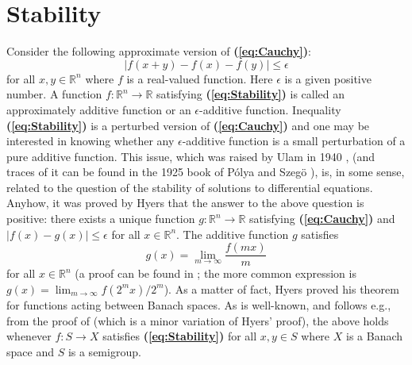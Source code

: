 \documentclass[12 pt]{amsart}
\theoremstyle{definition}
\newcommand{\R}{\mathbb{R}}
\newcommand{\beqref}[1]{\textbf{(\ref{#1})}} %
\begin{document}
\section{Stability}\label{sec:Stability} Consider the following approximate version of \beqref{eq:Cauchy}: 
\begin{equation}\label{eq:Stability}
|f(x+y)-f(x)-f(y)|\leq\epsilon 
\end{equation}
for all $x,y\in \R^n$ where $f$ is a real-valued function. Here $\epsilon$ is a given positive number. A function 
$f:\R^n\to\R$ satisfying \beqref{eq:Stability} is called an approximately additive function 
or an $\epsilon$-additive function. Inequality \beqref{eq:Stability} is a perturbed 
version of \beqref{eq:Cauchy} and one may be interested in knowing whether any 
$\epsilon$-additive function is a small perturbation of a pure additive function. 
This issue, which was raised by Ulam in 1940 \cite[p. 222]{Hyers1941}, \cite[p. 64]{Ulam1960} (and traces of it can be found in the 1925 book of P\'olya and Szeg\"o \cite[Problem 99, p. 17]{PolyaSzego1925book}), is, in some sense, related to the question 
of the stability of solutions to differential equations. Anyhow, it was proved by 
Hyers \cite{Hyers1941} 
 that the answer to the above question is positive: there exists 
 a unique function $g:\R^n\to\R$ satisfying \beqref{eq:Cauchy} 
and $|f(x)-g(x)|\leq\epsilon$ for all $x\in \R^n$. 
The additive function $g$ satisfies 
\begin{equation}\label{eq:Lim_g_fm}
g(x)=\lim_{m\to\infty}\frac{f(mx)}{m} 
\end{equation}
for all $x\in \R^n$ (a proof can be found  in  \cite[p. 484]{Kuczma2009book}; the 
more common expression is $g(x)=\lim_{m\to\infty}f(2^m x)/2^m$). 
As a matter of fact, Hyers proved his theorem for functions acting between Banach spaces. As is well-known, 
 and follows e.g., from the proof of  \cite[Theorem 17.1.1, pp. 483--484]{Kuczma2009book} 
(which is a minor variation of Hyers' proof), the above holds 
whenever $f:S\to X$ satisfies \beqref{eq:Stability} for all $x,y\in S$ where $X$ is a Banach space and $S$ is a semigroup. 
\end{document}
